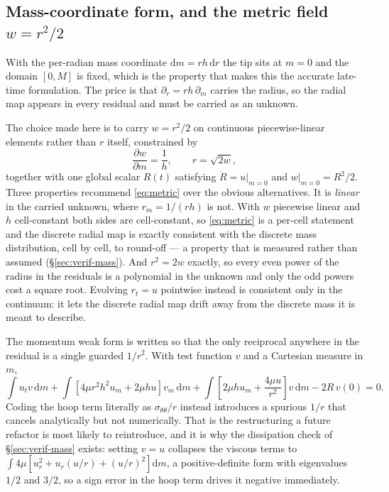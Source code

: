 \documentclass[11pt,a4paper]{article}
\begin{document}
\subsection{Mass-coordinate form, and the metric field $w = r^{2}/2$}
\label{sec:mass}

With the per-radian mass coordinate $\mathrm{d}m = r h\,\mathrm{d}r$ the tip
sits at $m=0$ and the domain $[0,M]$ is fixed, which is the property that makes
this the accurate late-time formulation. The price is that
$\partial_{r} = r h\,\partial_{m}$ carries the radius, so the radial map appears
in every residual and must be carried as an unknown.

The choice made here is to carry $w = r^{2}/2$ on continuous piecewise-linear
elements rather than $r$ itself, constrained by
%
\begin{equation}
  \frac{\partial w}{\partial m} = \frac{1}{h},
  \qquad r = \sqrt{2w},
  \label{eq:metric}
\end{equation}
%
together with one global scalar $R(t)$ satisfying $\dot{R} = u|_{m=0}$ and
$w|_{m=0} = R^{2}/2$. Three properties recommend \eqref{eq:metric} over the
obvious alternatives. It is \emph{linear} in the carried unknown, where
$r_{m} = 1/(rh)$ is not. With $w$ piecewise linear and $h$ cell-constant both
sides are cell-constant, so \eqref{eq:metric} is a per-cell statement and the
discrete radial map is exactly consistent with the discrete mass distribution,
cell by cell, to round-off --- a property that is measured rather than assumed
(\S\ref{sec:verif-mass}). And $r^{2} = 2w$ exactly, so every even power of the
radius in the residuals is a polynomial in the unknown and only the odd powers
cost a square root. Evolving $r_{t} = u$ pointwise instead is consistent only in
the continuum: it lets the discrete radial map drift away from the discrete mass
it is meant to describe.

The momentum weak form is written so that the only reciprocal anywhere in the
residual is a single guarded $1/r^{2}$. With test function $v$ and a Cartesian
measure in $m$,
%
\begin{equation}
  \int u_{t}v\,\mathrm{d}m
  + \int\left[4\mu r^{2}h^{2}u_{m} + 2\mu h u\right]v_{m}\,\mathrm{d}m
  + \int\left[2\mu h u_{m} + \frac{4\mu u}{r^{2}}\right]v\,\mathrm{d}m
  - 2R\,v(0) = 0 .
  \label{eq:massweak}
\end{equation}
%
Coding the hoop term literally as $\sigma_{\theta\theta}/r$ instead introduces a
spurious $1/r$ that cancels analytically but not numerically. That is the
restructuring a future refactor is most likely to reintroduce, and it is why
the dissipation check of \S\ref{sec:verif-mass} exists: setting $v = u$
collapses the viscous terms to
$\int 4\mu\left[u_{r}^{2} + u_{r}(u/r) + (u/r)^{2}\right]\mathrm{d}m$, a
positive-definite form with eigenvalues $1/2$ and $3/2$, so a sign error in the
hoop term drives it negative immediately.
\end{document}
